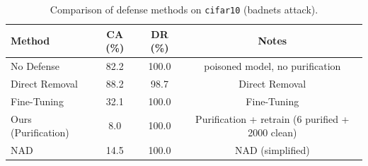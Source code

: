 \begin{table}[htbp]
\centering
\caption{Comparison of defense methods on \texttt{cifar10} (badnets attack).}
\label{tab:results}
\begin{tabular}{lccc}
\toprule
Method & CA (\%) & DR (\%) & Notes \\
\midrule
  No Defense & 82.2 & 100.0 & poisoned model, no purification \\
  Direct Removal & 88.2 & 98.7 & Direct Removal \\
  Fine-Tuning & 32.1 & 100.0 & Fine-Tuning \\
  Ours (Purification) & 8.0 & 100.0 & Purification + retrain (6 purified + 2000 clean) \\
  NAD & 14.5 & 100.0 & NAD (simplified) \\
\bottomrule
\end{tabular}
\end{table}
